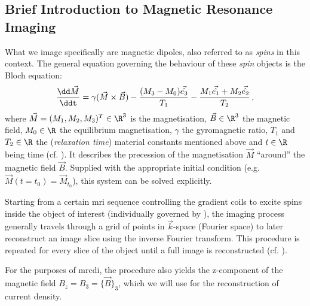 \documentclass[10pt]{article}
\newcommand{\hatvec}[1]{\vec{\hat{#1}}}
\begin{document}
  \subsection{Brief Introduction to Magnetic Resonance Imaging}
  What we image specifically are magnetic dipoles, also referred to as \textit{spins} in this context.
  The general equation governing the behaviour of these \textit{spin} objects is the Bloch equation:
  \begin{equation}
    \frac{\dd \vec{M}}{\ddt} = \gamma (\vec{M} \times \vec{B}) - \frac{(M_3 - M_0) \hatvec{e_3}}{T_1} - \frac{M_1 \hatvec{e_1} + M_2 \hatvec{e_2}}{T_2}\,,
    \label{eq:bloch}
  \end{equation}
  where $\vec{M} = (M_1, M_2, M_3)^T \in \R^3$ is the magnetisation, $\vec{B} \in \R^3$ the magnetic field, $M_0 \in \R$ the equilibrium magnetisation, $\gamma$ the gyromagnetic ratio, $T_1$ and $T_2 \in \R$ the (\textit{relaxation time}) material constants mentioned above and $t \in \R$ being time (cf. \cite{1996-mri-basics}).
  It describes the precession of the magnetisation $\vec{M}$ ``around'' the magnetic field $\vec{B}$.
  Supplied with the appropriate initial condition (e.g. $\vec{M}(t=t_0) = \vec{M}_{t_0}$), this system can be solved explicitly.

  Starting from a certain \gls{mri} sequence controlling the gradient coils to excite spins inside the object of interest (individually governed by ), the imaging process generally travels through a grid of points in $\vec{k}$-space (Fourier space) to later reconstruct an image slice using the inverse Fourier transform.
  This procedure is repeated for every slice of the object until a full image is reconstructed (cf. \cite{1996-mri-basics}).

  For the purposes of \gls{mrcdi}, the procedure also yields the z-component of the magnetic field $B_z = B_3 = \{\vec{B}\}_3$, which we will use for the reconstruction of current density.
\end{document}
